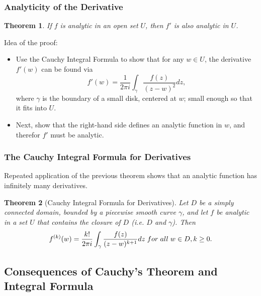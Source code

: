 \documentclass{article}
\newtheorem{theorem}{Theorem}[section]
\begin{document}
\subsubsection{Analyticity of the Derivative}
\begin{theorem}
If $f$ is analytic in an open set $U$, then $f'$ is also analytic in $U$.
\end{theorem}
Idea of the proof:
\begin{itemize}
\item Use the Cauchy Integral Formula to show that for any $w \in U$, the derivative $f'(w)$ can be found via
\begin{equation*}
f'(w) = \frac{1}{2\pi i} \int_{\gamma} \frac{f(z)}{(z - w)^2}dz,
\end{equation*}
where $\gamma$ is the boundary of a small disk, centered at $w$; small enough so that it fits into $U$.
\item Next, show that the right-hand side defines an analytic function in $w$, and therefor $f'$ must be analytic.
\end{itemize}

\subsubsection{The Cauchy Integral Formula for Derivatives}
Repeated application of the previous theorem shows that an analytic function has infinitely many derivatives.
\begin{theorem}[Cauchy Integral Formula for Derivatives]
Let $D$ be a simply connected domain, bounded by a piecewise smooth curve $\gamma$, and let $f$ be analytic in a set $U$ that contains the closure of $D$ (i.e. $D$ and $\gamma$). Then
\begin{equation*}
f^{(k)}(w) = \frac{k!}{2\pi i} \int_{\gamma} \frac{f(z)}{(z - w)^{k+1}}dz \hspace{0.1cm} for \hspace{0.1cm} all \hspace{0.1cm} w \in D, k \geq 0.
\end{equation*}
\end{theorem}

\subsection{Consequences of Cauchy's Theorem and Integral Formula}
\end{document}
